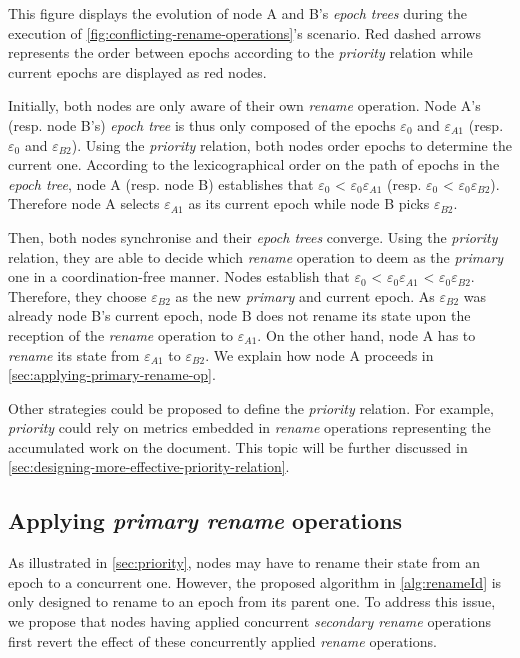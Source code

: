 \documentclass[10pt,journal,compsoc]{IEEEtran}
\newcommand{\epoch}[1]{$\varepsilon_{#1}$}
\begin{document}
This figure displays the evolution of node A and B's \emph{epoch trees} during the execution of \autoref{fig:conflicting-rename-operations}'s scenario.
Red dashed arrows represents the order between epochs according to the \emph{priority} relation while current epochs are displayed as red nodes.

Initially, both nodes are only aware of their own \emph{rename} operation.
Node A's (resp. node B's) \emph{epoch tree} is thus only composed of the epochs \epoch{0} and \epoch{A1} (resp. \epoch{0} and \epoch{B2}).
Using the \emph{priority} relation, both nodes order epochs to determine the current one.
According to the lexicographical order on the path of epochs in the \emph{epoch tree}, node A (resp. node B) establishes that \epoch{0} < \epoch{0}\epoch{A1} (resp. \epoch{0} < \epoch{0}\epoch{B2}).
Therefore node A selects \epoch{A1} as its current epoch while node B picks \epoch{B2}.

Then, both nodes synchronise and their \emph{epoch trees} converge.
Using the \emph{priority} relation, they are able to decide which \emph{rename} operation to deem as the \emph{primary} one in a coordination-free manner.
Nodes establish that \epoch{0} < \epoch{0}\epoch{A1} < \epoch{0}\epoch{B2}.
Therefore, they choose \epoch{B2} as the new \emph{primary} and current epoch.
As \epoch{B2} was already node B's current epoch, node B does not rename its state upon the reception of the \emph{rename} operation to \epoch{A1}.
On the other hand, node A has to \emph{rename} its state from \epoch{A1} to \epoch{B2}.
We explain how node A proceeds in \autoref{sec:applying-primary-rename-op}.

Other strategies could be proposed to define the \emph{priority} relation.
For example, \emph{priority} could rely on metrics embedded in \emph{rename} operations representing the accumulated work on the document.
This topic will be further discussed in \autoref{sec:designing-more-effective-priority-relation}.

\subsection{Applying \emph{primary rename} operations}

\label{sec:applying-primary-rename-op}

As illustrated in \autoref{sec:priority}, nodes may have to rename their state from an epoch to a concurrent one.
However, the proposed algorithm in \autoref{alg:renameId} is only designed to rename to an epoch from its parent one.
To address this issue, we propose that nodes having applied concurrent \emph{secondary rename} operations first revert the effect of these concurrently applied \emph{rename} operations.
\end{document}
